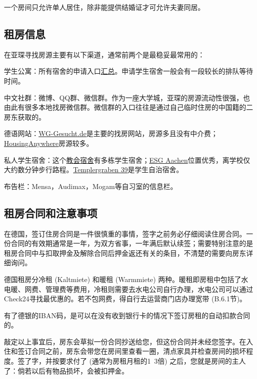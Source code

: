     一个房间只允许单人居住，除非能提供结婚证才可允许夫妻同居。

  \subsection{租房信息}\label{subsec:租房信息}

    在亚琛寻找房源主要有以下渠道，通常前两个是最稳妥最常用的：

    \textbullet 学生公寓：所有宿舍的申请入口\href{https://bewerberportal.stw.rwth-aachen.de/app.php/de/}{汇总}。申请学生宿舍一般会有一段较长的排队等待时间。

    \textbullet 中文社群：微博、QQ群、微信群。作为一座大学城，亚琛的房源流动性很强，也由此有很多本地找房微信群。微信群的入口往往是通过自己临时住房的中国籍的二房东获取的。

    \textbullet 德语网站：\href{http://www.wg-gesucht.de}{WG-Gesucht.de}是主要的找房网站，房源多且没有中介费；\href{http://www.studenten-wg.de}{HousingAnywhere}房源较多。

    \textbullet 私人学生宿舍：这个\href{http://www.stwkhg.de/}{教会宿舍}有多栋学生宿舍；\href{http://www.esg.rwth-aachen.de}{ESG Aachen}位置优秀，离学校仅大约数分钟步行路程。\href{http://www.t39.rwth-aachen.de/}{Templergraben 39}是学生自治宿舍。

    \textbullet 布告栏：Mensa，Audimax，Mogam等自习室的信息栏。

  \subsection{租房合同和注意事项}\label{subsec:租房合同和注意事项}

    在德国，签订住房合同是一件很慎重的事情，签字之前务必仔细阅读住房合同。一份合同的有效期通常是一年，为双方省事，一年满后默认续签；需要特别注意的是租房合同中与扣取押金及解除合同后押金返还有关的条目，不清楚的需要向房东详细询问。

    德国租房分冷租 (Kaltmiete) 和暖租 (Warmmiete) 两种。暖租即房租中包括了水电暖、网费、管理费等费用，冷租则需要去水电公司自行办理，水电公司可以通过Check24寻找最优惠的。若不包网费，得自行去运营商门店办理宽带 (B.6.1节)。

    有了德银的IBAN码，是可以在没有收到银行卡的情况下签订房租的自动扣款合同的。

    敲定以上事宜后，房东会草拟一份合同抄送给您，但这份合同并未经您签字。在入住和签订合同之前，房东会带您在房间里查看一圈，清点家具并检查房间的损坏程度。签了字，并按要求付了 (通常为房租月租的1~3倍) 之后，您就是房间的主人了：倘若以后有物品损坏，会被扣押金。

